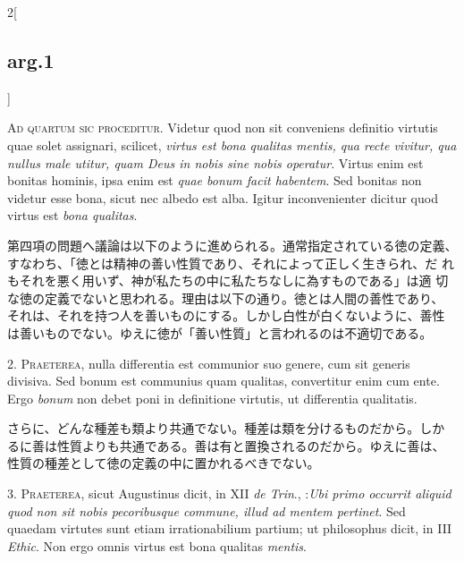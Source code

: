 \documentclass[paper=a4paper,fontsize=10pt,jafontsize=9pt,titlepage]{jlreq}
\begin{document}
\begin{paracol}{2}[\subsection{arg.1}]

{\scshape Ad quartum sic proceditur}. Videtur quod non sit conveniens
definitio virtutis quae solet assignari, scilicet, {\itshape virtus
est bona qualitas mentis, qua recte vivitur, qua nullus male utitur,
quam Deus in nobis sine nobis operatur}. Virtus enim est bonitas
hominis, ipsa enim est {\itshape quae bonum facit habentem}. Sed
bonitas non videtur esse bona, sicut nec albedo est alba. Igitur
inconvenienter dicitur quod virtus est {\itshape bona qualitas}.

\switchcolumn

第四項の問題へ議論は以下のように進められる。通常指定されている徳の定義、
すなわち、「徳とは精神の善い性質であり、それによって正しく生きられ、だ
れもそれを悪く用いず、神が私たちの中に私たちなしに為すものである」は適
切な徳の定義でないと思われる。理由は以下の通り。徳とは人間の善性であり、
それは、それを持つ人を善いものにする。しかし白性が白くないように、善性
は善いものでない。ゆえに徳が「善い性質」と言われるのは不適切である。


2. {\scshape Praeterea}, nulla differentia est communior suo genere,
cum sit generis divisiva. Sed bonum est communius quam qualitas,
convertitur enim cum ente. Ergo {\itshape bonum} non debet poni in
definitione virtutis, ut differentia qualitatis.

\switchcolumn

さらに、どんな種差も類より共通でない。種差は類を分けるものだから。しか
るに善は性質よりも共通である。善は有と置換されるのだから。ゆえに善は、
性質の種差として徳の定義の中に置かれるべきでない。


3. {\scshape Praeterea}, sicut Augustinus dicit, in XII {\itshape de
Trin}., :{\itshape Ubi primo occurrit aliquid quod non sit nobis
pecoribusque commune, illud ad mentem pertinet}. Sed quaedam virtutes
sunt etiam irrationabilium partium; ut philosophus dicit, in III
{\itshape Ethic}. Non ergo omnis virtus est bona qualitas {\itshape
mentis}.


\end{paracol}
\end{document}
